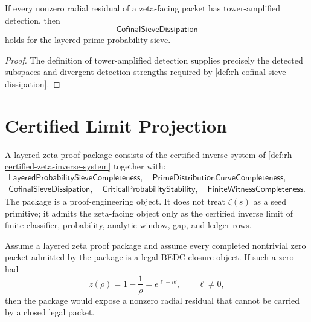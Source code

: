 \begin{corollary}
\label{cor:rh-amplified-detection-implies-cofinal-dissipation}
If every nonzero radial residual of a zeta-facing packet has
tower-amplified detection, then
$$
\mathsf{CofinalSieveDissipation}
$$
holds for the layered prime probability sieve.
\end{corollary}

\begin{proof}
The definition of tower-amplified detection supplies precisely the
detected subspaces and divergent detection strengths required by
\autoref{def:rh-cofinal-sieve-dissipation}.
\end{proof}

\section{Certified Limit Projection}
\label{sec:rh-probability-sieve-tower-certified-limit}

\begin{definition}
\label{def:rh-layered-zeta-proof-package}
A layered zeta proof package consists of the certified inverse system of
\autoref{def:rh-certified-zeta-inverse-system} together with:
$$
\begin{gathered}
\mathsf{LayeredProbabilitySieveCompleteness},\quad
\mathsf{PrimeDistributionCurveCompleteness},\\
\mathsf{CofinalSieveDissipation},\quad
\mathsf{CriticalProbabilityStability},\quad
\mathsf{FiniteWitnessCompleteness}.
\end{gathered}
$$
The package is a proof-engineering object.  It does not treat
$\zeta(s)$ as a seed primitive; it admits the zeta-facing object only as
the certified inverse limit of finite classifier, probability, analytic
window, gap, and ledger rows.
\end{definition}

\begin{theorem}
\label{thm:rh-layered-package-projects-radial-residuals-to-illegal-closure}
Assume a layered zeta proof package and assume every completed
nontrivial zero packet admitted by the package is a legal BEDC closure
object.  If such a zero had
$$
z(\rho)=1-\frac1\rho=e^{\ell+i\theta},
\qquad
\ell\ne0,
$$
then the package would expose a nonzero radial residual that cannot be
carried by a closed legal packet.
\end{theorem}

